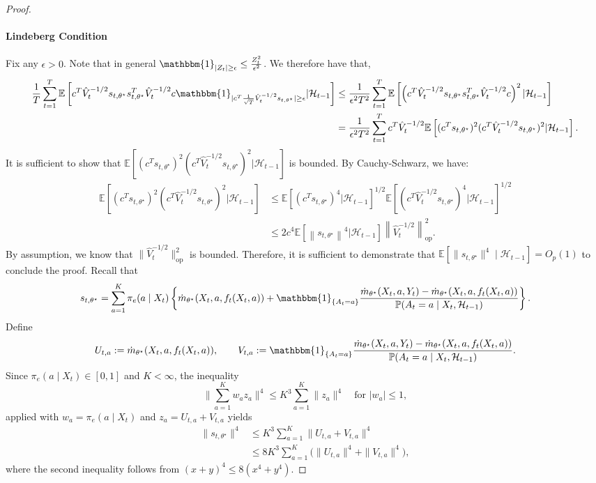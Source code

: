 \documentclass[11pt]{article}
\newcommand{\E}{\mathbb{E}}
\newcommand{\norm}[1]{\left\lVert#1\right\rVert}
\begin{document}
\begin{appendix}
\begin{proof}
\paragraph{Lindeberg Condition} Fix any $\epsilon > 0$. Note that in general $\mathbbm{1}_{|Z_{t}|\ge \epsilon} \le \frac{Z_{t}^{2} }{\epsilon^{2}} $. We therefore have that,
\begin{align*}\frac{1}{T}  \sum_{t=1}^{T} \E\left[c^{T}\hat{V}_{t}^{-1/2} s_{t,\theta^{\star}} s_{t,\theta^{\star}}^{T}    \hat{V}_{t}^{-1/2}c \mathbbm{1}_{ |c^{T}\frac{1}{\sqrt{T}}\hat{V}_{t}^{-1/2} s_{t,\theta^{\star}} |\ge \epsilon    } |\mathcal{H}_{t-1}\right] &\le \frac{1}{\epsilon^{2}T^{2}}  \sum_{t=1}^{T} \E\left[\left(c^{T}\hat{V}_{t}^{-1/2} s_{t,\theta^{\star}} s_{t,\theta^{\star}}^{T}    \hat{V}_{t}^{-1/2}c \right)^{2}|\mathcal{H}_{t-1}\right]\\
&=\frac{1}{\epsilon^{2}T^{2}}\sum_{t=1}^{T}c^{T}\hat{V}_{t}^{-1/2}\E\left[ (c^{T}s_{t,\theta^{\star}})^{2} (c^{T} \hat{V}_{t}^{-1/2}s_{t,\theta^{\star}})^{2} |\mathcal{H}_{t-1} \right]. \\ 
\end{align*}
It is sufficient to show that $\E\left[ (c^{T}s_{t,\theta^{\star}})^{2} (c^{T} \hat{V}_{t}^{-1/2}s_{t,\theta^{\star}})^{2} |\mathcal{H}_{t-1} \right]$ is bounded. By Cauchy-Schwarz, we have:
\begin{align*}
\E\left[ (c^{T}s_{t,\theta^{\star}})^{2} (c^{T} \hat{V}_{t}^{-1/2}s_{t,\theta^{\star}})^{2} |\mathcal{H}_{t-1} \right] &\le \E\left[ (c^{T}s_{t,\theta^{\star}})^{4}|\mathcal{H}_{t-1}\right]^{1/2}\E\left[ (c^{T} \hat{V}_{t}^{-1/2}s_{t,\theta^{\star}})^{4} |\mathcal{H}_{t-1}\right]^{1/2} \\
&\le 2c^{4} \E\left[ \norm{s_{t,\theta^{\star}}}^{4} |\mathcal{H}_{t-1} \right] \norm{\hat{V}_{t}^{-1/2}}_{\text{op}}^{2}.
\end{align*}
By assumption, we know that $\|\widehat{V}_{t}^{-1/2}\|_{\mathrm{op}}^{2}$ is bounded. Therefore, it is sufficient to demonstrate that
$\E\!\left[ \|s_{t,\theta^{\star}}\|^{4} \mid \mathcal{H}_{t-1} \right] = O_{p}(1)$ to conclude the proof. Recall that
\[
s_{t,\theta^\star}
=\sum_{a=1}^{K}\pi_e(a\mid X_t)\left\{
\dot m_{\theta^\star}(X_t,a,f_t(X_t,a))
+\mathbbm{1}_{\{A_t=a\}}
\frac{\dot m_{\theta^\star}(X_t,a,Y_t)-\dot m_{\theta^\star}(X_t,a,f_t(X_t,a))}{\mathbb P(A_t=a\mid X_t,\mathcal H_{t-1})}
\right\}.
\]
Define
\[
U_{t,a}:=\dot m_{\theta^\star}(X_t,a,f_t(X_t,a)),\qquad
V_{t,a}:=\mathbbm{1}_{\{A_t=a\}}
\frac{\dot m_{\theta^\star}(X_t,a,Y_t)-\dot m_{\theta^\star}(X_t,a,f_t(X_t,a))}{\mathbb P(A_t=a\mid X_t,\mathcal H_{t-1})}.
\]
Since $\pi_e(a\mid X_t)\in[0,1]$ and $K<\infty$, the inequality
\[
\Big\|\sum_{a=1}^{K} w_a z_a\Big\|^{4}
\le K^{3}\sum_{a=1}^{K}\|z_a\|^{4}
\quad\text{for } |w_a|\le 1,
\]
applied with $w_a=\pi_e(a\mid X_t)$ and $z_a=U_{t,a}+V_{t,a}$ yields
\begin{align*}
\|s_{t,\theta^\star}\|^{4}
&\le K^{3}\sum_{a=1}^{K}\|U_{t,a}+V_{t,a}\|^{4} \\
&\le 8K^{3}\sum_{a=1}^{K}\big(\|U_{t,a}\|^{4}+\|V_{t,a}\|^{4}\big),
\end{align*}
where the second inequality follows from $(x+y)^4\le 8(x^4+y^4)$.


\end{proof}
\end{appendix}
\end{document}

